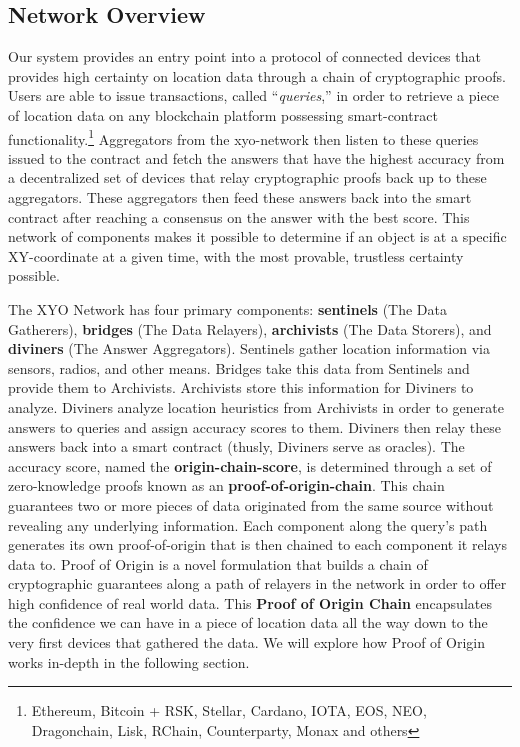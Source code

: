 \documentclass{article}
\begin{document}
\subsection {Network Overview}
Our system provides an entry point into a protocol of connected devices that provides high \gls{certainty} on location data through a chain of cryptographic proofs. Users are able to issue transactions, called ``\textit{queries},'' in order to retrieve a piece of location data on any blockchain platform possessing \gls{smart-contract} functionality.\footnote{Ethereum, Bitcoin + RSK, Stellar, Cardano, IOTA, EOS, NEO, Dragonchain, Lisk, RChain, Counterparty, Monax and others} Aggregators from the \Gls{xyo-network} then listen to these queries issued to the contract and fetch the answers that have the highest accuracy from a decentralized set of devices that relay cryptographic proofs back up to these aggregators. These aggregators then feed these answers back into the smart contract after reaching a consensus on the answer with the best score. This network of components makes it possible to determine if an object is at a specific XY-coordinate at a given time, with the most provable, \gls{trustless} certainty possible.

The XYO Network has four primary components: \textbf{\Glspl{sentinel}} (The Data Gatherers), \textbf{\Glspl{bridge}} (The Data Relayers), \textbf{\Glspl{archivist}} (The Data Storers), and \textbf{\Glspl{diviner}} (The Answer Aggregators). Sentinels gather location information via sensors, radios, and other means. Bridges take this data from Sentinels and provide them to Archivists. Archivists store this information for Diviners to analyze. Diviners analyze location \glspl{heuristic} from Archivists in order to generate answers to queries and assign accuracy scores to them. Diviners then relay these answers back into a smart contract (thusly, Diviners serve as \glspl{oracle}). The accuracy score, named the \textbf{\Gls{origin-chain-score}}, is determined through a set of zero-knowledge proofs known as an \textbf{\Gls{proof-of-origin-chain}}. This chain guarantees two or more pieces of data originated from the same source without revealing any underlying information. Each component along the query's path generates its own \Gls{proof-of-origin} that is then chained to each component it relays data to. Proof of Origin is a novel formulation that builds a chain of cryptographic guarantees along a path of relayers in the network in order to offer high confidence of real world data. This \textbf{Proof of Origin Chain} encapsulates the confidence we can have in a piece of location data all the way down to the very first devices that gathered the data. We will explore how Proof of Origin works in-depth in the following section.
\end{document}

